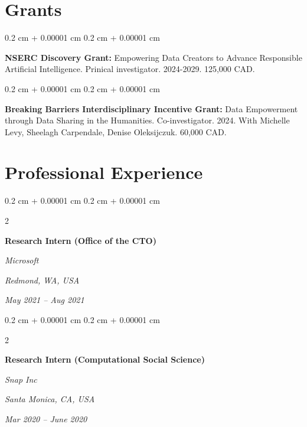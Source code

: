 \documentclass[10pt, letterpaper]{article}
\newenvironment{onecolentry}{
    \begin{adjustwidth}{
        0.2 cm + 0.00001 cm
    }{
        0.2 cm + 0.00001 cm
    }
}{
    \end{adjustwidth}
} %
\newenvironment{twocolentry}[2][]{
    \onecolentry
    \def\secondColumn{#2}
    \setcolumnwidth{\fill, 4.1 cm}
    \begin{paracol}{2}
}{
    \switchcolumn \raggedleft \secondColumn
    \end{paracol}
    \endonecolentry
} %
\begin{document}
    \section{Grants}



        
        \begin{onecolentry}
            \textbf{NSERC Discovery Grant:} Empowering Data Creators to Advance Responsible Artificial Intelligence. Prinical investigator. 2024-2029. 125,000 CAD.
        \end{onecolentry}

        \vspace{0.2 cm}

        \begin{onecolentry}
            \textbf{Breaking Barriers Interdisciplinary Incentive Grant:} Data Empowerment through Data Sharing in the Humanities. Co-investigator. 2024. With Michelle Levy, Sheelagh Carpendale, Denise Oleksijczuk. 60,000 CAD.
        \end{onecolentry}


    
    \section{Professional Experience}



        
        \begin{twocolentry}{
        \textit{Redmond, WA, USA}    
            
        \textit{May 2021 – Aug 2021}}
            \textbf{Research Intern (Office of the CTO)}
            
            \textit{Microsoft}
        \end{twocolentry}



        \vspace{0.2 cm}

        \begin{twocolentry}{
        \textit{Santa Monica, CA, USA}    
            
        \textit{Mar 2020 – June 2020}}
            \textbf{Research Intern (Computational Social Science)}
            
            \textit{Snap Inc}
        \end{twocolentry}



        \vspace{0.2 cm}
\end{document}
